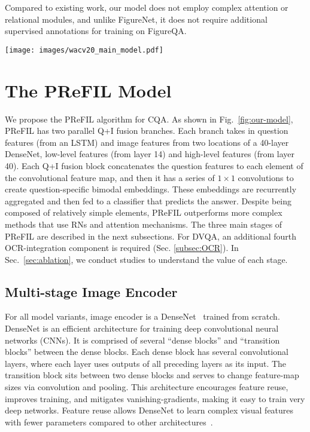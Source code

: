 \documentclass[10pt,twocolumn]{article}
\begin{document}
Compared to existing work, our model does not employ complex attention or relational modules, and unlike FigureNet, it does not require additional supervised annotations for training on FigureQA.

\begin{figure*}
    \centering
    \texttt{[image: images/wacv20\_main\_model.pdf]}
    \caption{Components of our PReFIL model. Magnified views show the details of each dense block and Q+I fusion block. \label{fig:our-model}}
\end{figure*}

\section{The PReFIL Model}\label{sec:PReFIL}

We propose the PReFIL algorithm for CQA. As shown in Fig.~\ref{fig:our-model}, PReFIL has two parallel Q+I fusion branches. Each branch takes in question features (from an LSTM) and image features from two locations of a 40-layer DenseNet, \ie low-level features (from layer 14) and high-level features (from layer 40). Each Q+I fusion block concatenates the question features to each element of the convolutional feature map, and then it has a series of $1 \times 1$ convolutions to create question-specific bimodal embeddings. These embeddings are recurrently aggregated and then fed to a classifier that predicts the answer. Despite being composed of relatively simple elements, PReFIL outperforms more complex methods that use RNs and attention mechanisms. The three main stages of PReFIL are  described in the next subsections. For DVQA, an additional fourth OCR-integration component is required (Sec. \ref{subsec:OCR}). In Sec.~\ref{sec:ablation}, we conduct studies to understand the value of each stage.

\subsection{Multi-stage Image Encoder}
For all model variants, image encoder is a DenseNet~\cite{huang2017densely} trained from scratch. DenseNet is an efficient architecture for training deep convolutional neural networks (CNNs). It is comprised of several ``dense blocks'' and ``transition blocks'' between the dense blocks. Each dense block has several convolutional layers, where each layer uses outputs of all preceding layers as its input. The transition block sits between two dense blocks and serves to change feature-map sizes via convolution and pooling. This architecture encourages feature reuse, improves training, and mitigates vanishing-gradients, making it easy to train very deep networks. Feature reuse allows DenseNet to learn complex visual features with fewer parameters compared to other architectures~\cite{huang2017condensenet}.
\end{document}
